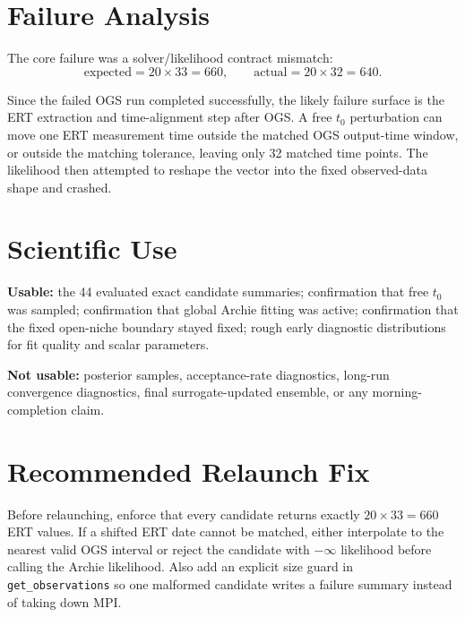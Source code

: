 \documentclass[10pt,a4paper]{article}
\begin{document}
\section*{Failure Analysis}

The core failure was a solver/likelihood contract mismatch:
\[
\mathrm{expected} = 20 \times 33 = 660,\qquad
\mathrm{actual} = 20 \times 32 = 640.
\]

Since the failed OGS run completed successfully, the likely failure surface is the
ERT extraction and time-alignment step after OGS. A free $t_0$ perturbation can move one ERT
measurement time outside the matched OGS output-time window, or outside the matching tolerance,
leaving only 32 matched time points. The likelihood then attempted to reshape the vector into the
fixed observed-data shape and crashed.

\section*{Scientific Use}

\textbf{Usable:} the 44 evaluated exact candidate summaries; confirmation that free $t_0$ was
sampled; confirmation that global Archie fitting was active; confirmation that the fixed
open-niche boundary stayed fixed; rough early diagnostic distributions for fit quality and scalar
parameters.

\textbf{Not usable:} posterior samples, acceptance-rate diagnostics, long-run convergence
diagnostics, final surrogate-updated ensemble, or any morning-completion claim.

\section*{Recommended Relaunch Fix}

Before relaunching, enforce that every candidate returns exactly $20 \times 33 = 660$ ERT values.
If a shifted ERT date cannot be matched, either interpolate to the nearest valid OGS interval or
reject the candidate with $-\infty$ likelihood before calling the Archie likelihood. Also add an
explicit size guard in \texttt{get\_observations} so one malformed candidate writes a failure
summary instead of taking down MPI.
\end{document}
